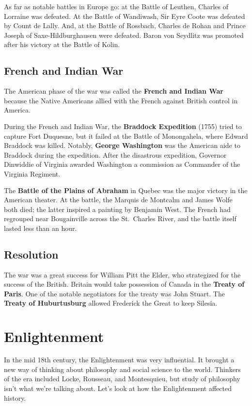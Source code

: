 As far as notable battles in Europe go: at the Battle of Leuthen, Charles of Lorraine was defeated.
At the Battle of Wandiwash, Sir Eyre Coote was defeated by Count de Lally.
And, at the Battle of Rossbach, Charles de Rohan and Prince Joseph of Saxe-Hildburghausen were defeated.
Baron von Seydlitz was promoted after his victory at the Battle of Kolin.

\subsection*{French and Indian War}

The American phase of the war was called the \textbf{French and Indian War}
because the Native Americans allied with the French against British control in America.

During the French and Indian War, the \textbf{Braddock Expedition} (1755) tried to capture Fort Duquesne,
but it failed at the Battle of Monongahela, where Edward Braddock was killed.
Notably, \textbf{George Washington} was the American aide to Braddock during the expedition.
After the disastrous expedition,
Governor Dinwiddie of Virginia awarded Washington a commission as Commander of the Virginia Regiment.

The \textbf{Battle of the Plains of Abraham} in Quebec was the major victory in the American theater.
At the battle, the Marquis de Montcalm and James Wolfe both died; the latter inspired a painting by Benjamin West.
The French had regrouped near Bougainville across the St.\ Charles River,
and the battle itself lasted less than an hour.

\subsection*{Resolution}

The war was a great success for William Pitt the Elder, who strategized for the success of the British.
Britain would take possession of Canada in the \textbf{Treaty of Paris}.
One of the notable negotiators for the treaty was John Stuart.
The \textbf{Treaty of Huburtusburg} allowed Frederick the Great to keep Silesia.

\section{Enlightenment}

In the mid 18th century, the Enlightenment was very influential.
It brought a new way of thinking about philosophy and social science to the world.
Thinkers of the era included Locke, Rousseau, and Montesquieu,
but study of philosophy isn't what we're talking about.
Let's look at how the Enlightenment affected history.

